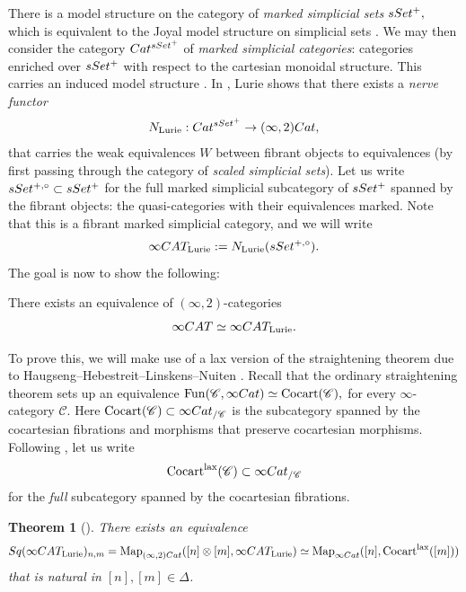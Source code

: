 \documentclass[a4paper, 11pt]{amsart}
\newtheorem{theorem}{Theorem}
\numberwithin{theorem}{section}
\theoremstyle{definition}
\newcommand{\cat}[1]{\textup{#1}}
\newcommand{\map}{\mathrm{Map}}
\newcommand{\fun}{\mathrm{Fun}}
\newcommand{\Cat}{\cat{Cat}}
\newcommand{\CAT}{\cat{CAT}}
\newcommand{\sSet}{\cat{sSet}}
\newcommand{\Cocart}{\mathrm{Cocart}}
\newcommand{\lax}{\mathrm{lax}}
\newcommand{\C}{\mathscr{C}}
\newcommand{\Sq}{\cat{Sq}}
\begin{document}
There is a model structure on the category of \textit{marked simplicial sets} 
$
\sSet^+,
$
which is equivalent to the Joyal model structure on simplicial sets \cite[Chapter 3]{HTT}. We may then consider the category 
$
\Cat^{\sSet^+}
$
of \textit{marked simplicial categories}: categories enriched over $\sSet^+$ with respect to the cartesian monoidal structure.
This carries an induced model structure \cite[Section A.3]{HTT}. In \cite{LurieInfty2}, Lurie shows 
that there exists a \textit{nerve functor} 
$$
N_\mathrm{Lurie} : \Cat^{\sSet^+} \rightarrow (\infty,2)\Cat,
$$
that carries the weak equivalences $W$ between fibrant objects
to equivalences (by first passing through the category of \textit{scaled simplicial sets}). 
Let us write $\sSet^{+,\circ} \subset \sSet^+$ for the full marked simplicial subcategory of $\sSet^+$ spanned by the fibrant objects: the quasi-categories with their equivalences marked. 
Note that this is a fibrant marked simplicial category, and we will write 
$$
\infty\CAT_\mathrm{Lurie} := N_\mathrm{Lurie}(\sSet^{+,\circ}).
$$
The goal is now to show the following:

\begin{proposition}\label{prop.comparison-models-infty2-infty-cats}
	There exists an equivalence of $(\infty,2)$-categories
	$$
	\infty\CAT \simeq \infty\CAT_\mathrm{Lurie}.
	$$
\end{proposition}

To prove this, we will make use of a lax version of the straightening theorem due to Haugseng--Hebestreit--Linskens--Nuiten \cite{HHLN}. Recall that the ordinary straightening theorem sets up an equivalence 
$
 \fun(\C, \infty\Cat) \simeq \Cocart(\C),
$
 for every $\infty$-category
$\C$. Here 
$
\Cocart(\C) \subset \infty\Cat_{/\C} 
$
is the subcategory spanned by the cocartesian fibrations and morphisms that preserve cocartesian morphisms. 
Following \cite{HHLN}, let  us write 
$$
\Cocart^\lax(\C) \subset \infty\Cat_{/\C} 
$$
for the \textit{full} subcategory spanned by the cocartesian fibrations.
\begin{theorem}[{\cite[Theorem 5.3.1]{HHLN}}]\label{thm.lax-straightening}
	There exists an equivalence
	$$
	\Sq(\infty\CAT_\mathrm{Lurie})_{n,m} = \map_{(\infty,2)\Cat}([n] \otimes [m], \infty\CAT_\mathrm{Lurie}) \simeq \map_{\infty\Cat}([n], \Cocart^\lax([m]))
	$$
	that is natural in $[n],[m] \in \Delta$.
\end{theorem}
\end{document}
